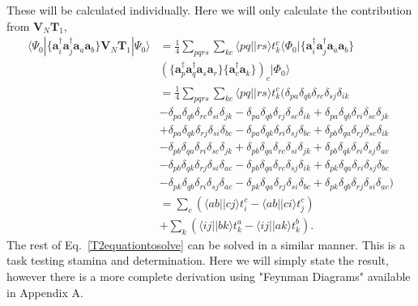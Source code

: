 \documentclass[a4paper,norsk,11pt,twoside]{report}
\begin{document}
These will be calculated individually. Here we will only calculate the contribution from $\textbf{V}_N \textbf{T}_1$,
\begin{align}
\langle \Psi_{0} | \{\textbf{a}^{\dag}_i \textbf{a}^{\dag}_j \textbf{a}_a \textbf{a}_b\}  \textbf{V}_N \textbf{T}_1 | \Psi_0 \rangle & = 
\frac{1}{4}
\sum_{pqrs}
\sum_{kc}
\langle pq|| rs \rangle t_k^c \langle \Phi_0 | \{
\textbf{a}^{\dag}_i
\textbf{a}^{\dag}_j
\textbf{a}_a
\textbf{a}_b \} \nonumber \\ & 
\left(
\{
\textbf{a}^{\dag}_p
\textbf{a}^{\dag}_q
\textbf{a}_s
\textbf{a}_r
\}
\{
\textbf{a}^{\dag}_c
\textbf{a}_k
\}
\right)_c | \Phi_0 \rangle
\nonumber \\ & = 
\frac{1}{4} \sum_{pqrs} \sum_{kc} \langle pq||rs\rangle t_k^c ( \delta_{pa} \delta_{qb} \delta_{rc} \delta_{sj} \delta_{ik}  \nonumber \\ & 
- \delta_{pa} \delta_{qb} \delta_{rc} \delta_{si} \delta_{jk}
- \delta_{pa} \delta_{qb} \delta_{rj} \delta_{sc} \delta_{ik}
+ \delta_{pa} \delta_{qb} \delta_{ri} \delta_{sc} \delta_{jk}
\nonumber \\ & 
+ \delta_{pa} \delta_{qk} \delta_{rj} \delta_{si} \delta_{bc}
- \delta_{pa} \delta_{qk} \delta_{ri} \delta_{sj} \delta_{bc}
+ \delta_{pb} \delta_{qa} \delta_{rj} \delta_{sc} \delta_{ik}
 \nonumber \\ & 
- \delta_{pb} \delta_{qa} \delta_{ri} \delta_{sc} \delta_{jk}
+ \delta_{pb} \delta_{qa} \delta_{rc} \delta_{si} \delta_{jk} 
+ \delta_{pb} \delta_{qk} \delta_{ri} \delta_{sj} \delta_{ac} \nonumber \\ & 
- \delta_{pb} \delta_{qk} \delta_{rj} \delta_{si} \delta_{ac}
- \delta_{pb} \delta_{qa} \delta_{rc} \delta_{sj} \delta_{ik}
+ \delta_{pk} \delta_{qa} \delta_{ri} \delta_{sj} \delta_{bc} \nonumber \\ & 
- \delta_{pk} \delta_{qb} \delta_{ri} \delta_{sj} \delta_{ac}
- \delta_{pk} \delta_{qa} \delta_{rj} \delta_{si} \delta_{bc}
+ \delta_{pk} \delta_{qb} \delta_{rj} \delta_{si} \delta_{ac}) \nonumber \\ &
= \sum_c \left( \langle ab || cj \rangle t_i^c - \langle ab || ci \rangle t_j^c \right) \nonumber \\ & 
+ \sum_k \left( \langle ij || bk \rangle t_k^a - \langle ij||ak\rangle t_k^b \right) .
\end{align}
The rest of Eq.~\eqref{T2equationtosolve} can be solved in a similar
manner. This is a task testing stamina and determination. Here we will
simply state the result, however there is a more complete derivation
using "Feynman Diagrams" available in Appendix A. \\
\end{document}
